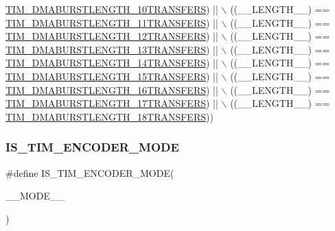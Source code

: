 \begin{DoxyCode}
      \hyperlink{group___t_i_m___d_m_a___burst___length_ga793a89bb8a0669e274de451985186c53}{TIM\_DMABURSTLENGTH\_10TRANSFERS}) || \(\backslash\)
                                            ((\_\_LENGTH\_\_) == 
      \hyperlink{group___t_i_m___d_m_a___burst___length_ga79ab58b6a3b30c54c0758b381df22cb0}{TIM\_DMABURSTLENGTH\_11TRANSFERS}) || \(\backslash\)
                                            ((\_\_LENGTH\_\_) == 
      \hyperlink{group___t_i_m___d_m_a___burst___length_gaf52962b501b3a76d89df6274ed425947}{TIM\_DMABURSTLENGTH\_12TRANSFERS}) || \(\backslash\)
                                            ((\_\_LENGTH\_\_) == 
      \hyperlink{group___t_i_m___d_m_a___burst___length_ga06a81eba628bea6495d86ebcc6021da0}{TIM\_DMABURSTLENGTH\_13TRANSFERS}) || \(\backslash\)
                                            ((\_\_LENGTH\_\_) == 
      \hyperlink{group___t_i_m___d_m_a___burst___length_ga5f430b76c0aeded0a8d8be779f26ae52}{TIM\_DMABURSTLENGTH\_14TRANSFERS}) || \(\backslash\)
                                            ((\_\_LENGTH\_\_) == 
      \hyperlink{group___t_i_m___d_m_a___burst___length_ga98a4d88c533178bc1b4347e4c5ce815a}{TIM\_DMABURSTLENGTH\_15TRANSFERS}) || \(\backslash\)
                                            ((\_\_LENGTH\_\_) == 
      \hyperlink{group___t_i_m___d_m_a___burst___length_gaf4b2a1fe12c52272544c21e17de1ed90}{TIM\_DMABURSTLENGTH\_16TRANSFERS}) || \(\backslash\)
                                            ((\_\_LENGTH\_\_) == 
      \hyperlink{group___t_i_m___d_m_a___burst___length_gad31c1fca7ed436a53efc4f290144584d}{TIM\_DMABURSTLENGTH\_17TRANSFERS}) || \(\backslash\)
                                            ((\_\_LENGTH\_\_) == 
      \hyperlink{group___t_i_m___d_m_a___burst___length_gabb6f72b02ee1c8855de241cb0713e2ca}{TIM\_DMABURSTLENGTH\_18TRANSFERS}))
\end{DoxyCode}
\mbox{\label{group___t_i_m___private___macros_ga481a8b96f840e75c5df82a99ebabc778}} 
\subsubsection{\texorpdfstring{I\+S\+\_\+\+T\+I\+M\+\_\+\+E\+N\+C\+O\+D\+E\+R\+\_\+\+M\+O\+DE}{IS\_TIM\_ENCODER\_MODE}}
{\footnotesize\ttfamily \#define I\+S\+\_\+\+T\+I\+M\+\_\+\+E\+N\+C\+O\+D\+E\+R\+\_\+\+M\+O\+DE(\begin{DoxyParamCaption}\item[{}]{\+\_\+\+\_\+\+M\+O\+D\+E\+\_\+\+\_\+ }\end{DoxyParamCaption})}

